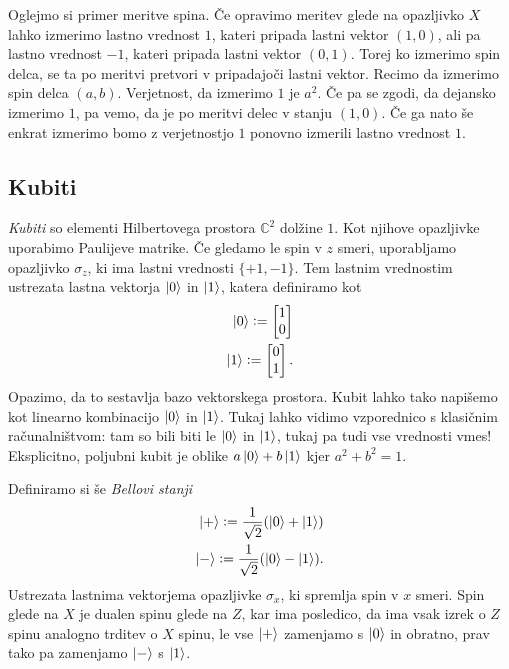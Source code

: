 \documentclass[mat1]{fmfdelo}
\newcommand{\defeq}{\vcentcolon=}
\begin{document}
Oglejmo si primer meritve spina. Če opravimo meritev glede na opazljivko \(X\) lahko izmerimo lastno vrednost \(1\), kateri pripada lastni vektor \((1,0)\), ali pa lastno vrednost \(-1\), kateri pripada lastni vektor \((0,1)\). Torej ko izmerimo spin delca, se ta po meritvi pretvori v pripadajoči lastni vektor. Recimo da izmerimo spin delca \((a,b)\). Verjetnost, da izmerimo \(1\) je \(a^2\). Če pa se zgodi, da dejansko izmerimo \(1\), pa vemo, da je po meritvi delec v stanju \((1,0)\). Če ga nato še enkrat izmerimo bomo z verjetnostjo \(1\) ponovno izmerili lastno vrednost \(1\).
\subsection{Kubiti}
\emph{Kubiti} so elementi Hilbertovega prostora \(\mathbb C^2\) dolžine \(1\). Kot njihove opazljivke uporabimo Paulijeve matrike. Če gledamo le spin v \(z\) smeri, uporabljamo opazljivko \(\sigma_z\), ki ima lastni vrednosti \(\{+1, -1\}\). Tem lastnim vrednostim ustrezata lastna vektorja \(\ket0\) in \(\ket1\), katera definiramo kot
\begin{align*}
    \ket0 \defeq \begin{bmatrix}
        1\\0
    \end{bmatrix}\\
    \ket1 \defeq \begin{bmatrix}
        0\\1
    \end{bmatrix}.
\end{align*}
Opazimo, da to sestavlja bazo vektorskega prostora. Kubit lahko tako napišemo kot linearno kombinacijo \(\ket0\) in \(\ket1\). Tukaj lahko vidimo vzporednico s klasičnim računalništvom: tam so bili biti le \(\ket0\) in \(\ket1\), tukaj pa tudi vse vrednosti vmes! Eksplicitno, poljubni kubit je oblike \(a\ket0+b\ket1\) kjer \(a^2+b^2=1\).

Definiramo si še \emph{Bellovi stanji}
\begin{align*}
    \ket{+} \defeq \frac{1}{\sqrt2} (\ket0+\ket1)\\
    \ket{-} \defeq \frac{1}{\sqrt2} (\ket0-\ket1).
\end{align*}
Ustrezata lastnima vektorjema opazljivke \(\sigma_x\), ki spremlja spin v \(x\) smeri. Spin glede na \(X\) je dualen spinu glede na \(Z\), kar ima posledico, da ima vsak izrek o \(Z\) spinu analogno trditev o \(X\) spinu, le vse \(\ket+\) zamenjamo s \(\ket0\) in obratno, prav tako pa zamenjamo \(\ket-\) s \(\ket1\).
\end{document}
